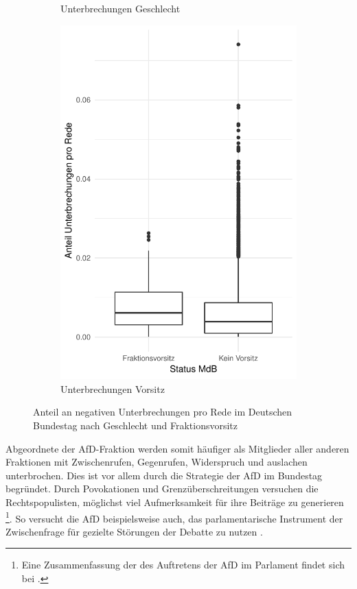 \documentclass[12pt, 
    twoside=false, 
    bibliography=totoc, 
    numbers=endperiod, 
    headings=normal, 
    toc=chapterentrydotfill
    ]{scrbook}
\begin{document}
\begin{figure}[H]
\begin{subfigure}{.5\textwidth}
      \caption{Unterbrechungen Geschlecht}
      \label{fig:boxplot_unterbrechung_geschlecht}
    \end{subfigure}%
    \begin{subfigure}{.5\textwidth}
      \centering
      \includegraphics[width=.9\linewidth]{document/images/boxplot_unterbrechung_vorsitz.pdf}
      \caption{Unterbrechungen Vorsitz}
      \label{fig:boxplot_unterbrechung_vorsitz}
    \end{subfigure}
    \caption[Anteil an negativen Unterbrechungen pro Rede im Deutschen Bundestag]{Anteil an negativen Unterbrechungen pro Rede im Deutschen Bundestag nach Geschlecht und Fraktionsvorsitz}
    \label{fig:boxplot_unterbrechung}
\end{figure}

Abgeordnete der AfD-Fraktion werden somit häufiger als Mitglieder aller anderen Fraktionen mit Zwischenrufen, Gegenrufen, Widerspruch und auslachen unterbrochen. Dies ist vor allem durch die Strategie der AfD im Bundestag begründet. Durch Povokationen und Grenzüberschreitungen versuchen die Rechtspopulisten, möglichst viel Aufmerksamkeit für ihre Beiträge zu generieren \parencite[vgl.][3ff.]{ruhose_2019}\footnote{Eine Zusammenfassung der des Auftretens der AfD im Parlament findet sich bei \textcite{ruhose_2019}.}. So versucht die AfD beispielsweise auch, das parlamentarische Instrument der Zwischenfrage für gezielte Störungen der Debatte zu nutzen \parencite[5]{ruhose_2019}.
\end{document}
